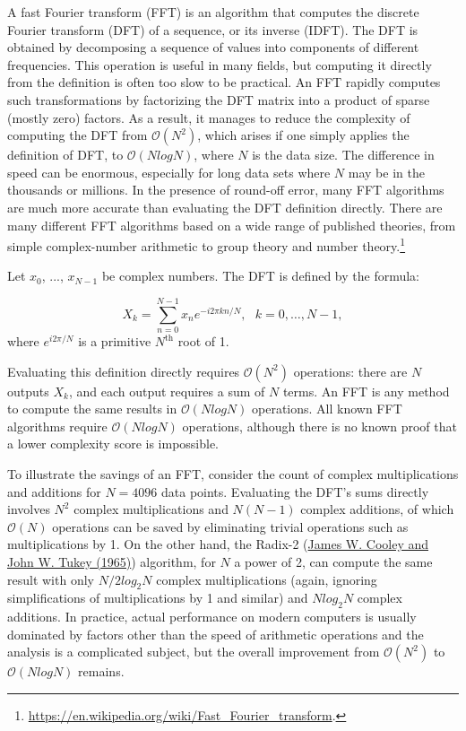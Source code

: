 \documentclass[12pt]{article}
\theoremstyle{plain}
\begin{document}
A fast Fourier transform (FFT) is an algorithm that computes the discrete Fourier transform (DFT) of a sequence, or its inverse (IDFT). The DFT is obtained by decomposing a sequence of values into components of different frequencies. This operation is useful in many fields, but computing it directly from the definition is often too slow to be practical. An FFT rapidly computes such transformations by factorizing the DFT matrix into a product of sparse (mostly zero) factors. As a result, it manages to reduce the complexity of computing the DFT from $\mathcal{O}(N^{2})$, which arises if one simply applies the definition of DFT, to $\mathcal{O}(N log N)$, where $N$ is the data size. The difference in speed can be enormous, especially for long data sets where $N$ may be in the thousands or millions. In the presence of round-off error, many FFT algorithms are much more accurate than evaluating the DFT definition directly. There are many different FFT algorithms based on a wide range of published theories, from simple complex-number arithmetic to group theory and number theory.\footnote{\url{https://en.wikipedia.org/wiki/Fast_Fourier_transform}.}

Let $x_0$, ..., $x_{N-1}$ be complex numbers. The DFT is defined by the formula:

\begin{equation}
X_k = \sum_{n=0}^{N-1} x_n e^{-i2\pi k n/N}, ~~~ k = 0, \ldots, N-1,
\end{equation}
where $e^{i 2\pi/N}$ is a primitive $N^{\text{th}}$ root of 1.

Evaluating this definition directly requires $\mathcal{O}(N^2)$ operations: there are $N$ outputs $X_k$, and each output requires a sum of $N$ terms. An FFT is any method to compute the same results in $\mathcal{O}(N log N)$ operations. All known FFT algorithms require $\mathcal{O}(N log N)$ operations, although there is no known proof that a lower complexity score is impossible.

To illustrate the savings of an FFT, consider the count of complex multiplications and additions for $N=4096$ data points. Evaluating the DFT's sums directly involves $N^2$ complex multiplications and $N(N-1)$ complex additions, of which $\mathcal{O}(N)$ operations can be saved by eliminating trivial operations such as multiplications by 1. On the other hand, the Radix-2 (\hyperlink{James W. Cooley and John W. Tukey (1965)}{James W. Cooley and John W. Tukey (1965)}) algorithm, for $N$ a power of 2, can compute the same result with only $N/2 log_2 N$ complex multiplications (again, ignoring simplifications of multiplications by 1 and similar) and $N log_2 N$ complex additions. In practice, actual performance on modern computers is usually dominated by factors other than the speed of arithmetic operations and the analysis is a complicated subject, but the overall improvement from $\mathcal{O}(N^2)$ to $\mathcal{O} (N log N)$ remains.
\end{document}
